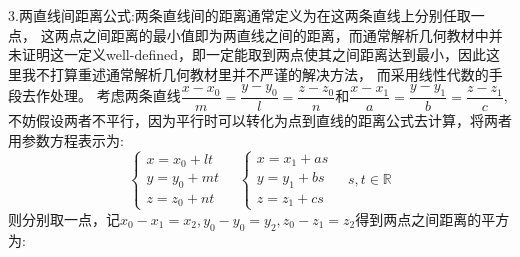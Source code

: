 \documentclass[a4paper,12pt]{ctexart}
\newenvironment{prooff}{{\noindent\it\textcolor{cyan!40!black}{Proof}:}\quad}{\par}
\begin{document}
3.两直线间距离公式:两条直线间的距离通常定义为在这两条直线上分别任取一点，
这两点之间距离的最小值即为两直线之间的距离，而通常解析几何教材中并未证明这一定义well-defined，即一定能取到两点使其之间距离达到最小，因此这里我不打算重述通常解析几何教材里并不严谨的解决方法，
而采用线性代数的手段去作处理。
\vskip 0.5cm
\begin{prooff}
    考虑两条直线$\dfrac{x-x_0}{m}=\dfrac{y-y_0}{l}=\dfrac{z-z_0}{n}$和$\dfrac{x-x_1}{a}=\dfrac{y-y_1}{b}=\dfrac{z-z_1}{c}$,不妨假设两者不平行，因为平行时可以转化为点到直线的距离公式去计算，将两者用参数方程表示为:
    \begin{equation*}
        \begin{cases}
            x=x_0+lt \\
            y=y_0+mt \\
            z=z_0+nt
        \end{cases}\quad \begin{cases}
            x=x_1+as \\
            y=y_1+bs \\
            z=z_1+cs
        \end{cases}\quad s,t\in \mathbb{R}
    \end{equation*}
    则分别取一点，记$x_0-x_1=x_2,y_0-y_0=y_2,z_0-z_1=z_2$得到两点之间距离的平方为:


\end{prooff}
\end{document}
